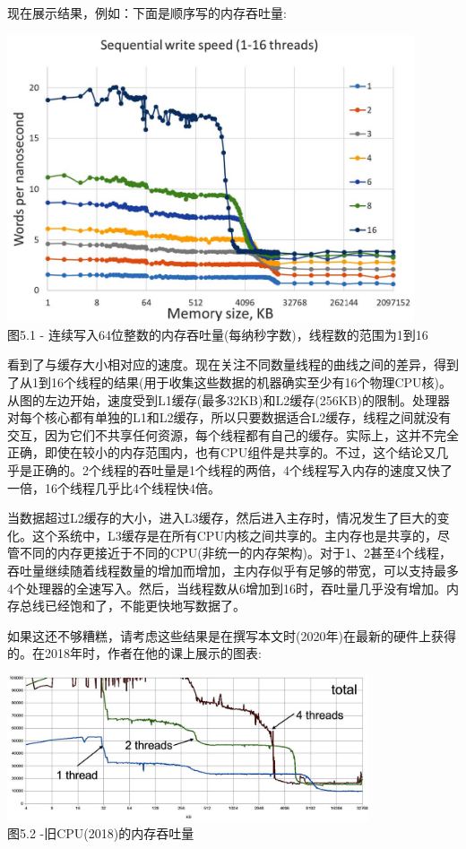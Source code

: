 现在展示结果，例如：下面是顺序写的内存吞吐量:

\begin{center}
\includegraphics[width=0.9\textwidth]{content/1/chapter5/images/1.jpg}\\
图5.1 - 连续写入64位整数的内存吞吐量(每纳秒字数)，线程数的范围为1到16
\end{center}

看到了与缓存大小相对应的速度。现在关注不同数量线程的曲线之间的差异，得到了从1到16个线程的结果(用于收集这些数据的机器确实至少有16个物理CPU核)。从图的左边开始，速度受到L1缓存(最多32KB)和L2缓存(256KB)的限制。处理器对每个核心都有单独的L1和L2缓存，所以只要数据适合L2缓存，线程之间就没有交互，因为它们不共享任何资源，每个线程都有自己的缓存。实际上，这并不完全正确，即使在较小的内存范围内，也有CPU组件是共享的。不过，这个结论又几乎是正确的。2个线程的吞吐量是1个线程的两倍，4个线程写入内存的速度又快了一倍，16个线程几乎比4个线程快4倍。

当数据超过L2缓存的大小，进入L3缓存，然后进入主存时，情况发生了巨大的变化。这个系统中，L3缓存是在所有CPU内核之间共享的。主内存也是共享的，尽管不同的内存更接近于不同的CPU(非统一的内存架构)。对于1、2甚至4个线程，吞吐量继续随着线程数量的增加而增加，主内存似乎有足够的带宽，可以支持最多4个处理器的全速写入。然后，当线程数从6增加到16时，吞吐量几乎没有增加。内存总线已经饱和了，不能更快地写数据了。

如果这还不够糟糕，请考虑这些结果是在撰写本文时(2020年)在最新的硬件上获得的。在2018年时，作者在他的课上展示的图表:

\begin{center}
\includegraphics[width=0.8\textwidth]{content/1/chapter5/images/2.jpg}\\
图5.2 -旧CPU(2018)的内存吞吐量
\end{center}

